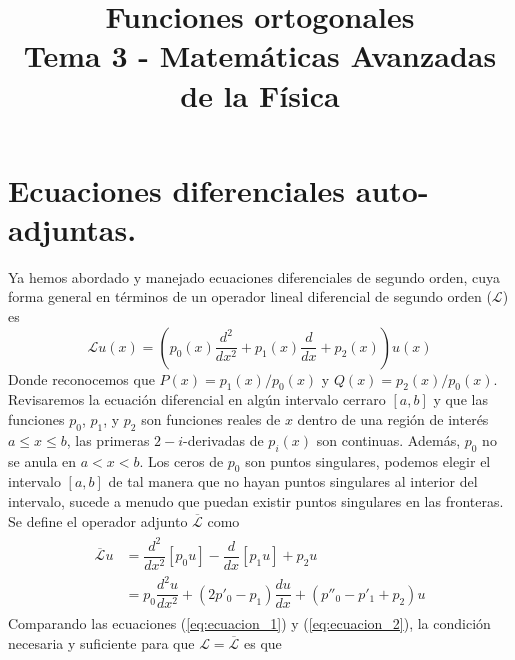 
\usepackage{mathrsfs}
\title{Funciones ortogonales \\ {\large Tema 3 - Matemáticas Avanzadas de la Física}}
\date{ }

\renewcommand\labelenumii{\theenumi.{\arabic{enumii}}}
\maketitle
\fontsize{14}{14}\selectfont
\section{Ecuaciones diferenciales auto-adjuntas.}
Ya hemos abordado y manejado ecuaciones diferenciales de segundo orden, cuya forma general en términos de un operador lineal diferencial de segundo orden ($\mathscr{L}$) es
\begin{equation}
\mathscr{L} u(x) = \left( p_{0}(x) \dfrac{d^{2}}{d x^{2}} + p_{1}(x) \dfrac{d}{dx} + p_{2}(x) \right)  u(x)
\label{eq:ecuacion_1}
\end{equation}
Donde reconocemos que $P(x) = p_{1}(x)/p_{0}(x)$ y $Q(x)= p_{2}(x)/p_{0}(x)$.
\\
Revisaremos la ecuación diferencial en algún intervalo cerraro $[a,b]$ y que las funciones $p_{0}$, $p_{1}$, y $p_{2}$ son funciones reales de $x$ dentro de una región de interés $a \leq x \leq b$, las primeras $2-i$-derivadas de $p_{i}(x)$ son continuas. Además, $p_{0}$ no se anula en $a<x<b$. Los ceros de $p_{0}$ son puntos singulares, podemos elegir el intervalo $[a,b]$ de tal manera que no hayan puntos singulares al interior del intervalo, sucede a menudo que puedan existir puntos singulares en las fronteras.
\\
Se define el operador adjunto $\overline{\mathscr{L}}$ como
\begin{eqnarray}
\begin{aligned}
\overline{\mathscr{L}} u &= \dfrac{d^{2}}{d x^{2}}[ p_{0} u] - \dfrac{d}{dx} [p_{1} u] + p_{2} u \\
&= p_{0}\dfrac{d^{2} u}{d x^{2}} + (2 p'_{0} - p_{1}) \dfrac{du}{dx} + (p''_{0} - p'_{1} + p_{2}) u
\label{eq:ecuacion_2}
\end{aligned}
\end{eqnarray}
Comparando las ecuaciones (\ref{eq:ecuacion_1}) y (\ref{eq:ecuacion_2}), la condición necesaria y suficiente para que $\mathscr{L} = \overline{\mathscr{L}}$ es que
